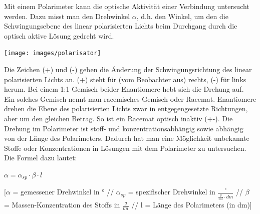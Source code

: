 \documentclass{scrartcl}  %
\begin{document}
\begin{tcolorbox}
				Mit einem Polarimeter kann die optische Aktivität  einer Verbindung untersucht werden. Dazu misst man den Drehwinkel $\alpha$, d.h. den Winkel, um den die Schwingungsebene des linear polarisierten Lichts beim Durchgang durch die optisch aktive Lösung gedreht wird.
				\begin{center}
					\texttt{[image: images/polarisator]}
				\end{center}
				Die Zeichen (+) und (-) geben die Änderung der Schwingungsrichtung des linear polarisierten Lichts an. (+) steht für (vom Beobachter aus) rechts, (-) für links herum. \newline 
				Bei einem 1:1 Gemisch beider Enantiomere hebt sich die Drehung auf. Ein solches Gemisch nennt man racemisches Gemisch oder Racemat. Enantiomere drehen die Ebene des polarisierten Lichts zwar in entgegengesetzte Richtungen, aber um den gleichen Betrag. So ist ein Racemat optisch inaktiv (+-). \newline
				Die Drehung im Polarimeter ist stoff- und konzentrationsabhängig sowie abhängig von der Länge des Polarimeters. Dadurch hat man eine Möglichkeit unbekannte Stoffe oder Konzentrationen in Lösungen mit dem Polarimeter zu untersuchen. \newline
				Die Formel dazu lautet: 
				\begin{center}
					$\alpha = \alpha_{sp} \cdot \beta \cdot l$
				\end{center}
				[$\alpha$ = gemessener Drehwinkel in ° // $\alpha_{sp}$ = spezifischer Drehwinkel in $\frac{°}{\frac{g}{ml} \cdot dm}$ // $\beta$ = Massen-Konzentration des Stoffs in $\frac{g}{ml}$ // l = Länge des Polarimeters (in dm)]
			\end{tcolorbox}
\end{document}
